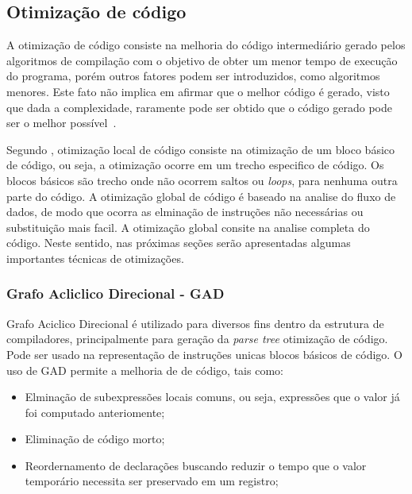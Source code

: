 
\subsection{Otimização de código}
\par
A otimização de código consiste na melhoria do código intermediário gerado pelos algoritmos de compilação com o objetivo de obter um menor tempo de execução do programa, porém outros fatores podem ser introduzidos, como algoritmos menores. Este fato não implica em afirmar que o melhor código é gerado, visto que dada a complexidade, raramente pode ser obtido que o código gerado pode ser o melhor possível~\cite{aho2007compilers}.

\par
Segundo \citeauthor{aho2007compilers}, otimização local de código consiste na otimização de um bloco básico de código, ou seja, a otimização ocorre em um trecho especifico de código. Os blocos básicos são trecho onde não ocorrem saltos ou \textit{loops}, para nenhuma outra parte do código. A otimização global de código é baseado na analise do fluxo de dados, de modo que ocorra as elminação de instruções não necessárias ou substituição mais facil. A otimização global consite na analise completa do código. Neste sentido, nas próximas seções serão apresentadas algumas importantes técnicas de otimizações.

\subsubsection{Grafo Acliclico Direcional - GAD}
\par
Grafo Aciclico Direcional é utilizado para diversos fins dentro da estrutura de compiladores, principalmente para geração da \textit{parse tree} otimização de código. Pode ser usado na representação de instruções unicas blocos básicos de código\cite{aho2007compilers}. O uso de GAD permite a melhoria de de código, tais como:
\begin{itemize}
\item Elminação de subexpressões locais comuns, ou seja, expressões que o valor já foi computado anteriomente;
\item Eliminação de código morto;
\item  Reordernamento de declarações buscando reduzir o tempo que o valor temporário necessita ser preservado em um registro;
\end{itemize}

